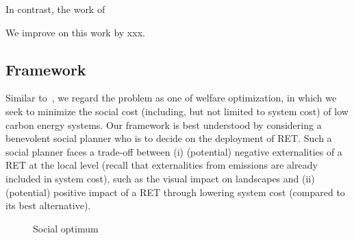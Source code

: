 \documentclass[final, 3p, times]{elsarticle} %
\begin{document}
    In contrast, the work of~\cite{Drechsler2011} %
     \cite{Drechsler2017}

    We improve on this work by xxx. 

    \subsection{Framework}
    Similar to~\cite{Drechsler2011}, we regard the problem as one of welfare optimization, in which we seek to minimize
    the social cost (including, but not limited to system cost) of low carbon energy systems.
    Our framework is best understood by considering a benevolent social planner who is to decide on the deployment of
    RET\@.
    Such a social planner faces a trade-off between
    (i) (potential) negative externalities of a RET at the local level (recall that externalities from emissions are
    already included in system cost), such as the visual impact on landscapes and
    (ii) (potential) positive impact of a RET through lowering system cost (compared to its best alternative).

    \begin{figure}[H]
        \centering
        \caption{Social optimum}
        \label{figure:social-optimum}
    \end{figure}
\end{document}
